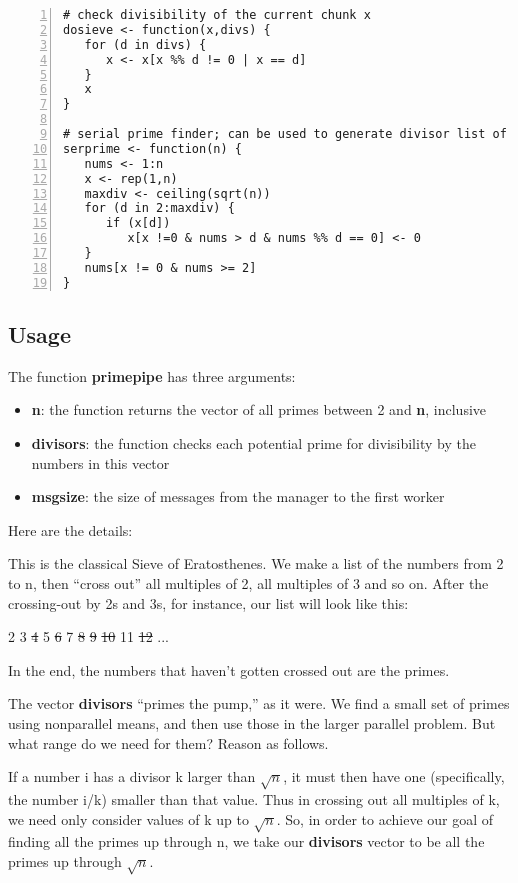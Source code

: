 \begin{lstlisting}[numbers=left]
# check divisibility of the current chunk x
dosieve <- function(x,divs) {
   for (d in divs) {
      x <- x[x %% d != 0 | x == d]
   }
   x
}

# serial prime finder; can be used to generate divisor list of primepipe
serprime <- function(n) {
   nums <- 1:n
   x <- rep(1,n)
   maxdiv <- ceiling(sqrt(n))
   for (d in 2:maxdiv) {
      if (x[d])
         x[x !=0 & nums > d & nums %% d == 0] <- 0
   }
   nums[x != 0 & nums >= 2]
}
\end{lstlisting}

\subsection{Usage}

The function {\bf primepipe} has three arguments:

\begin{itemize}

\item {\bf n}:  the function returns the vector of all primes between 2
and {\bf n}, inclusive

\item {\bf divisors}:  the function checks each potential prime for
divisibility by the numbers in this vector

\item {\bf msgsize}:  the size of messages from the manager to the first
worker

\end{itemize}

Here are the details:

This is the classical Sieve of Eratosthenes.  We make a list of the
numbers from 2 to n, then ``cross out'' all multiples of 2, all
multiples of 3 and so on.  After the crossing-out by 2s and 3s, for instance,
our list will look like this:

2 
3
\sout{4}
5
\sout{6}
7
\sout{8}
\sout{9}
\sout{10}
11
\sout{12}
...


In the end, the numbers that haven't gotten crossed out are the primes.

The vector {\bf divisors} ``primes the pump,'' as it were.  We find a
small set of primes using nonparallel means, and then use those in the
larger parallel problem.  But what range do we need for them?  Reason as
follows.

If a number i has a divisor k larger than $\sqrt{n}$, it must then have
one (specifically, the number i/k) smaller than that value.  Thus in
crossing out all multiples of k, we need only consider values of k up to
$\sqrt{n}$.  So, in order to achieve our goal of finding all the primes
up through n, we take our {\bf divisors} vector to be all the primes up
through $\sqrt{n}$.

